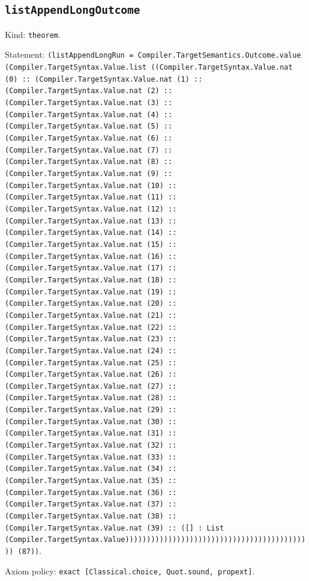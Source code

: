 \documentclass[11pt]{article}
\begin{document}
\subsection*{\texttt{listAppendLongOutcome}}
\noindent Kind: \texttt{theorem}.\par
\noindent Statement: \texttt{(listAppendLongRun = Compiler.TargetSemantics.Outcome.value (Compiler.TargetSyntax.Value.list ((Compiler.TargetSyntax.Value.nat (0) :: (Compiler.TargetSyntax.Value.nat (1) :: (Compiler.TargetSyntax.Value.nat (2) :: (Compiler.TargetSyntax.Value.nat (3) :: (Compiler.TargetSyntax.Value.nat (4) :: (Compiler.TargetSyntax.Value.nat (5) :: (Compiler.TargetSyntax.Value.nat (6) :: (Compiler.TargetSyntax.Value.nat (7) :: (Compiler.TargetSyntax.Value.nat (8) :: (Compiler.TargetSyntax.Value.nat (9) :: (Compiler.TargetSyntax.Value.nat (10) :: (Compiler.TargetSyntax.Value.nat (11) :: (Compiler.TargetSyntax.Value.nat (12) :: (Compiler.TargetSyntax.Value.nat (13) :: (Compiler.TargetSyntax.Value.nat (14) :: (Compiler.TargetSyntax.Value.nat (15) :: (Compiler.TargetSyntax.Value.nat (16) :: (Compiler.TargetSyntax.Value.nat (17) :: (Compiler.TargetSyntax.Value.nat (18) :: (Compiler.TargetSyntax.Value.nat (19) :: (Compiler.TargetSyntax.Value.nat (20) :: (Compiler.TargetSyntax.Value.nat (21) :: (Compiler.TargetSyntax.Value.nat (22) :: (Compiler.TargetSyntax.Value.nat (23) :: (Compiler.TargetSyntax.Value.nat (24) :: (Compiler.TargetSyntax.Value.nat (25) :: (Compiler.TargetSyntax.Value.nat (26) :: (Compiler.TargetSyntax.Value.nat (27) :: (Compiler.TargetSyntax.Value.nat (28) :: (Compiler.TargetSyntax.Value.nat (29) :: (Compiler.TargetSyntax.Value.nat (30) :: (Compiler.TargetSyntax.Value.nat (31) :: (Compiler.TargetSyntax.Value.nat (32) :: (Compiler.TargetSyntax.Value.nat (33) :: (Compiler.TargetSyntax.Value.nat (34) :: (Compiler.TargetSyntax.Value.nat (35) :: (Compiler.TargetSyntax.Value.nat (36) :: (Compiler.TargetSyntax.Value.nat (37) :: (Compiler.TargetSyntax.Value.nat (38) :: (Compiler.TargetSyntax.Value.nat (39) :: ([] : List (Compiler.TargetSyntax.Value)))))))))))))))))))))))))))))))))))))))))))) (87))}.\par
\noindent Axiom policy: \texttt{exact [Classical.choice, Quot.sound, propext]}.\par
\end{document}
